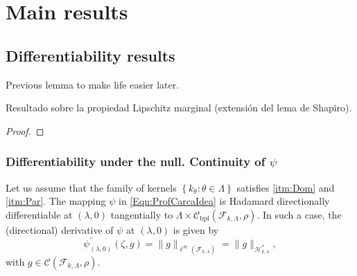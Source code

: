 \section{Main results}
	\subsection{Differentiability results}
		{\color{orange} Previous lemma to make life easier later}.
		\begin{Lema}\label{Lema:PartialLipschitz}
			{\color{orange}Resultado sobre la propiedad Lipschitz marginal (extensi\'{o}n del lema de Shapiro).}
		\end{Lema}
		\begin{proof}
			
		\end{proof}
		\subsubsection*{\color{orange} Differentiability under the null. Continuity of $\psi$}
			\begin{Th}\label{Th:Diff0}
				Let us assume that the family of kernels $\left\{k_{\theta}:\theta\in\Lambda\right\}$ satisfies \ref{itm:Dom} and \ref{itm:Par}. The mapping $\psi$ in \eqref{Eqn:ProfCarcaIdea} is Hadamard directionally differentiable at $(\lambda,0)$ tangentially to $\Lambda\times\mathcal{C}_{\operatorname{bpl}}\left(\mathcal{F}_{k,\Lambda},\rho\right)$. In such a case, the (directional) derivative of $\psi$ at $(\lambda,0)$ is given by
				\begin{equation}\label{Eqn:psi_prime0}
					\psi_{(\lambda,0)}^{\prime}(\zeta,g)=\|g\|_{\ell^{\infty}\left(\mathcal{F}_{k,\lambda}\right)}=\|g\|_{\mathcal{H}_{k,\lambda}^{\ast}},
				\end{equation}
				with $g\in\mathcal{C}\left(\mathcal{F}_{k,\Lambda},\rho\right)$.
			\end{Th}
